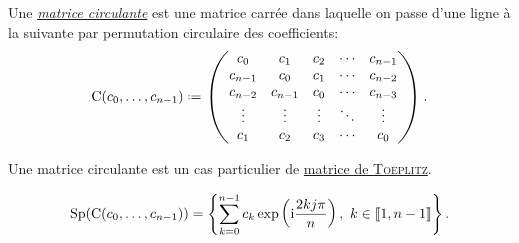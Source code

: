 \begin{defi}
Une \href{https://fr.wikipedia.org/wiki/Matrice_circulante}{\emph{matrice circulante}} est une matrice carrée dans laquelle on passe d'une ligne à la suivante par permutation circulaire des coefficients:
$$
\mathrm{C}(c_0, \dots, c_{n-1}) \defeq
\begin{pmatrix}
c_0 & c_1 & c_2 & \cdots & c_{n-1} \\
c_{n-1} & c_0 & c_1 & \cdots & c_{n-2} \\
c_{n-2} & c_{n-1} & c_0 & \cdots & c_{n-3} \\
\vdots & \vdots & \vdots & \ddots & \vdots \\
c_1 & c_2 & c_3 & \cdots & c_0
\end{pmatrix}.
$$
\end{defi}

\begin{remarque}
    Une matrice circulante est un cas particulier de \href{https://fr.wikipedia.org/wiki/Matrice_de_Toeplitz}{matrice de \textsc{Toeplitz}}.
\end{remarque}

\begin{prop}
    $$\mathrm{Sp}(\mathrm{C}(c_0, \dots, c_{n-1})) = \left \{ \sum_{k=0}^{n-1} c_k \exp \left( \mathrm{i} \frac{2kj \pi}{n} \right),\ k \in \llbracket 1, n-1 \rrbracket \right \}.$$
\end{prop}

